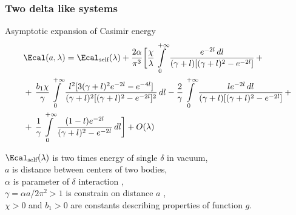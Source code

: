 \documentclass[10pt,t]{beamer}
\begin{document}
\begin{frame}
  \frametitle{Two delta like systems}


  Asymptotic expansion of Casimir energy
  \begin{equation}
    \label{eq:Herdegens-approach-29}
    \begin{split}
      &\Ecal( a, \lambda ) =
        \Ecal_{ \textrm{self} }( \lambda ) + \frac{ 2 \alpha }{ \pi^{ 3 } }
        \bigg[ \frac{ \chi }{ \lambda }
        \int\limits_{ 0 }^{ + \infty } \frac{ e^{ -2l } \, dl }{ ( \gamma + l )
        [ ( \gamma + l )^{ 2 } - e^{ -2l } ] } \, + \\
      &+ \, \frac{ b_{ 1 } \chi }{ \gamma } \int\limits_{ 0 }^{ +\infty }
        \frac{ l^{ 2 } [ 3 ( \gamma + l )^{ 2 } e^{ -2l } - e^{ -4l } ] }
        { ( \gamma + l )^{ 2 } [ ( \gamma + l )^{ 2 } - e^{ -2l } ]^{ 2 } } \, dl
        - \frac{ 2 }{ \gamma } \int\limits_{ 0 }^{ +\infty }
      \frac{ l e^{ -2l } \, dl }{ ( \gamma + l ) [ ( \gamma + l )^{ 2
        } - e^{ -2l } ] } \, + \\
      &+ \, \frac{ 1 }{ \gamma } \int\limits_{ 0 }^{ +\infty } \frac{ ( 1
        - l ) e^{ -2l } } { ( \gamma + l )^{ 2 } - e^{ -2l } } \, dl
      \bigg] + O( \lambda )
    \end{split}
  \end{equation}

  \vspace{-2em}



  $\Ecal_{ \textrm{self} }( \lambda )$ is two times energy of single $\delta$
  in vacuum, \\
  $a$ is distance between centers of two bodies, \\
  $\alpha$ is parameter of $\delta$ interaction
  \cite{AlbeverioEtAlSolvableModelsInQuantumMechanics1988}, \\
  $\gamma = \alpha a / 2 \pi^{ 2 } > 1$ is constrain on distance $a$
  \cite{AlbeverioEtAlSolvableModelsInQuantumMechanics1988}, \\
  $\chi > 0$ and $b_{ 1 } > 0$ are constants describing properties of
  function $g$.

\end{frame}
\end{document}
